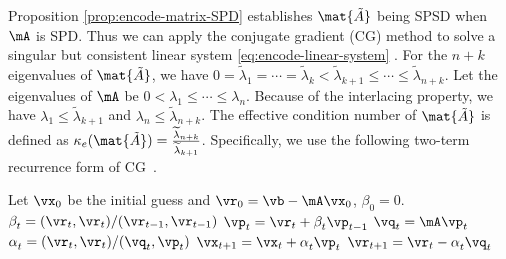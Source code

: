\documentclass[11pt]{article}
\newcommand{\tA}{\mat{\tilde{A}}}
\newcommand{\tlambda}{{\widetilde{\lambda}}}
\begin{document}
Proposition \ref{prop:encode-matrix-SPD} establishes $\tA$ being SPSD when $\mA$ is SPD.
Thus we can apply the conjugate gradient (CG) method to solve a singular but consistent
linear system \eqref{eq:encode-linear-system} \cite{AshbyMS:1990}. For the $n+k$
eigenvalues of $\tA$, we have $0=\tlambda_1=\cdots=\tlambda_k<\tlambda_{k+1}\leq\cdots\leq\tlambda_{n+k}$.
Let the eigenvalues of $\mA$ be $0<\lambda_1\leq\cdots\leq\lambda_n$. Because of the
interlacing property, we have $\lambda_1\leq \tlambda_{k+1}$ and $\lambda_n\leq \tlambda_{n+k}$.
The effective condition number of $\tA$ is defined as $\kappa_{e}(\tA)=\frac{\tlambda_{n+k}}{\tlambda_{k+1}}$.
Specifically, we use the following two-term recurrence form of CG~\cite{Meurant:2006}.
\begin{algorithm}
\caption{}
\begin{algorithmic}[1]
\label{alg:two-term-recurrence-cg}
\STATE Let $\vx_0$ be the initial guess and $\vr_0=\vb-\mA \vx_0$, $\beta_0=0$.
\STATE $\beta_{t}^{}=(\vr_t,\vr_t)/(\vr_{t-1},\vr_{t-1})$
\STATE $\vp_t=\vr_t+\beta_t^{} \vp_{t-1}$
\STATE $\vq_t=\mA \vp_t$
\STATE $\alpha_{t}^{} =(\vr_t,\vr_t)/(\vq_t,\vp_t)$
\STATE $\vx_{t+1}=\vx_t+\alpha_t^{} \vp_t$
\STATE $\vr_{t+1}=\vr_t-\alpha_t^{} \vq_t$
\ENDFOR
\end{algorithmic}
\end{algorithm}
\end{document}
